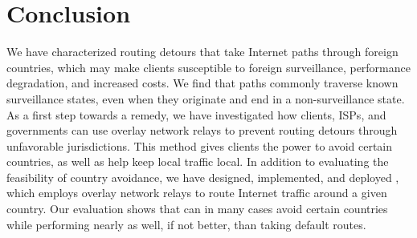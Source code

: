 \section{Conclusion}
\label{conclusion}

We have characterized routing
detours that take Internet paths through foreign countries, which may 
make clients susceptible to foreign surveillance, performance 
degradation, and increased costs.  We find that paths commonly traverse known
surveillance states, even when they originate and end in a
non-surveillance state.  As a first step towards a remedy, we have
investigated how clients, ISPs, and governments can use overlay network relays to prevent routing detours through
unfavorable jurisdictions.  This method gives clients the power to
avoid certain countries, as well as help keep local traffic local.
In addition to evaluating the feasibility of country avoidance, we have
designed, implemented, and deployed \system{}, which employs overlay network
relays to  route Internet traffic around a given country.  Our evaluation
shows  that \system{} can in many cases avoid certain countries while
performing nearly as well, if not better, than taking default routes.


